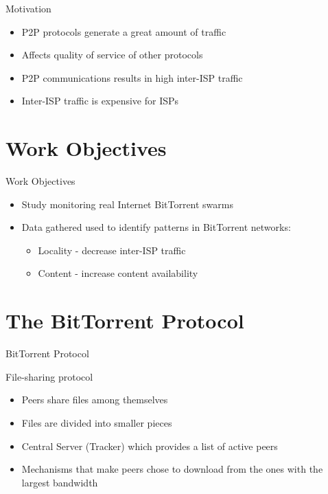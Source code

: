 \documentclass{beamer}
\begin{document}
\begin{frame}{Motivation}

\begin{itemize}
\addtolength{\itemsep}{1.5\baselineskip}
\item
   P2P protocols generate a great amount of traffic
\item
   Affects quality of service of other protocols

\item
   P2P communications results in high inter-ISP traffic 
\item
   Inter-ISP traffic is expensive for ISPs

\end{itemize}

\end{frame}



\section{Work Objectives}

\begin{frame}{Work Objectives}

\begin{itemize}
\addtolength{\itemsep}{1.2\baselineskip}
\item
   Study monitoring real Internet BitTorrent swarms 
\item
   Data gathered used to identify patterns in BitTorrent networks:

\begin{itemize}
\item
   Locality - decrease inter-ISP traffic
\item
   Content - increase content availability

\end{itemize}
\end{itemize}

\end{frame}


\section{The BitTorrent Protocol}

\begin{frame}{BitTorrent Protocol}

File-sharing protocol

\begin{itemize}
\item
   Peers share files among themselves
\item
   Files are divided into smaller pieces
\item
   Central Server (Tracker) which provides a list of active peers
\item
   Mechanisms that make peers chose to download from the ones with the largest bandwidth
\end{itemize}

\end{frame}
\end{document}
